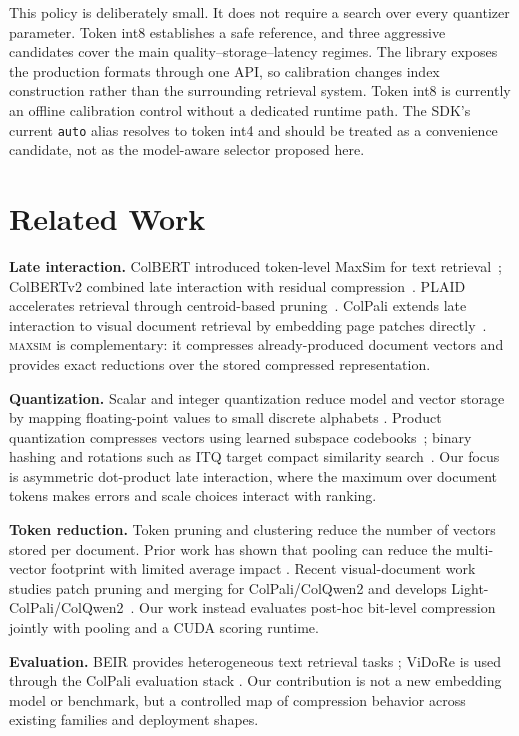 \documentclass{article}
\newcommand{\sysname}{\textsc{maxsim}}
\begin{document}
This policy is deliberately small. It does not require a search over every
quantizer parameter. Token int8 establishes a safe reference, and three
aggressive candidates cover the main quality--storage--latency regimes. The
library exposes the production formats through one API, so calibration
changes index construction rather than the surrounding retrieval system.
Token int8 is currently an offline calibration control without a dedicated
runtime path. The SDK's current \texttt{auto} alias resolves to token int4 and
should be treated as a convenience candidate, not as the model-aware selector
proposed here.

\section{Related Work}

\textbf{Late interaction.} ColBERT introduced token-level MaxSim for text
retrieval~\citep{khattab2020colbert}; ColBERTv2 combined late interaction with
residual compression~\citep{santhanam2022colbertv2}. PLAID accelerates
retrieval through centroid-based pruning~\citep{santhanam2022plaid}. ColPali
extends late interaction to visual document retrieval by embedding page
patches directly~\citep{faysse2025colpali}. \sysname{} is complementary: it
compresses already-produced document vectors and provides exact reductions
over the stored compressed representation.

\textbf{Quantization.} Scalar and integer quantization reduce model and vector
storage by mapping floating-point values to small discrete alphabets
\citep{jacob2018quant}. Product quantization compresses vectors using learned
subspace codebooks~\citep{jegou2011pq}; binary hashing and rotations such as
ITQ target compact similarity search~\citep{gong2013itq}. Our focus is
asymmetric dot-product late interaction, where the maximum over document
tokens makes errors and scale choices interact with ranking.

\textbf{Token reduction.} Token pruning and clustering reduce the number of
vectors stored per document. Prior work has shown that pooling can reduce the
multi-vector footprint with limited average impact
\citep{clavie2024pooling}. Recent visual-document work studies patch pruning
and merging for ColPali/ColQwen2 and develops
Light-ColPali/ColQwen2~\citep{ma2025storage}. Our work instead evaluates
post-hoc bit-level compression jointly with pooling and a CUDA scoring
runtime.

\textbf{Evaluation.} BEIR provides heterogeneous text retrieval tasks
\citep{thakur2021beir}; ViDoRe is used through the ColPali evaluation stack
\citep{faysse2025colpali}. Our contribution is not a new embedding model or
benchmark, but a controlled map of compression behavior across existing
families and deployment shapes.
\end{document}
